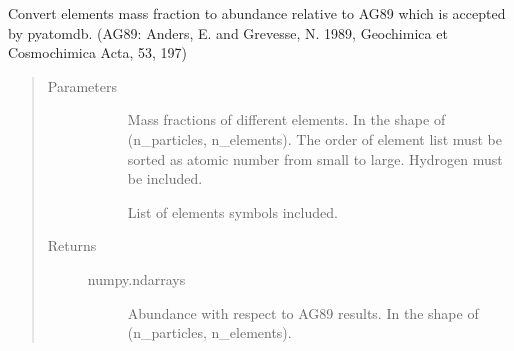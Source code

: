 \documentclass[letterpaper,10pt,english]{sphinxmanual}
\begin{document}
\begin{fulllineitems}
\label{\detokenize{gas_properties:modules.gas_properties.abundance_to_solar}}
Convert elements mass fraction to abundance 
relative to AG89 which is accepted by pyatomdb.
(AG89: Anders, E. and Grevesse, N. 1989, 
Geochimica et Cosmochimica Acta, 53, 197)
\begin{quote}\begin{description}
\item[{Parameters}] \leavevmode\begin{description}
\item[{}] \leavevmode
Mass fractions of different elements. In the 
shape of (n\_particles, n\_elements). The order 
of element list must be sorted as atomic number 
from small to large. Hydrogen must be included.

\item[{}] \leavevmode
List of elements symbols included.

\end{description}

\item[{Returns}] \leavevmode\begin{description}
\item[{numpy.ndarrays}] \leavevmode
Abundance with respect to AG89 results. In the 
shape of (n\_particles, n\_elements).

\end{description}

\end{description}\end{quote}

\end{fulllineitems}

\end{document}
